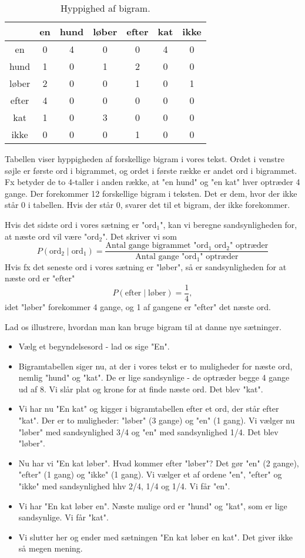 \documentclass{article}
\begin{document}
\begin{table}[h]
    \centering
    \begin{tabular}{c|cccccc}
         
         & en & hund & løber & efter &  kat & ikke\\
         \hline
        en & 0 & 4 & 0 & 0 & 4 & 0\\
        hund&1 & 0 & 1 & 2 & 0 & 0\\
         løber& 2 & 0 & 0 & 1 & 0 & 1 \\
      efter   & 4 & 0  & 0 & 0 & 0 & 0\\
      kat  & 1 & 0 & 3 & 0 & 0 & 0\\
       ikke  & 0 & 0 & 0 &1  & 0 & 0\\
    \end{tabular}
    \caption{Hyppighed af bigram.}
    \label{tab:my_label}
\end{table}

Tabellen viser hyppigheden af forskellige bigram i vores tekst.  Ordet i venstre søjle er første ord i bigrammet, og ordet i første række er andet ord i bigrammet. Fx betyder de to 4-taller i anden række, at "en hund" og "en kat" hver optræder 4 gange. Der forekommer 12 forskellige bigram i teksten. Det er dem, hvor der ikke står 0 i tabellen. Hvis der står 0, svarer det til et bigram, der ikke forekommer.

Hvis det sidste ord i vores sætning er "ord$_1$", kan vi beregne sandsynligheden for, at næste ord vil være "ord$_2$". Det skriver vi som
$$P(\text{ord}_2\mid \text{ord}_1) = \frac{\text{Antal gange bigrammet "ord$_1$ ord$_2$" optræder}}{\text{Antal gange "ord$_1$"  optræder}}$$
Hvis fx det seneste ord i vores sætning er "løber", så er sandsynligheden for at næste ord er "efter" 
$$P(\text{efter} \mid \text{løber})=\frac{1}{4},$$
idet "løber" forekommer 4 gange, og 1 af gangene er "efter" det næste ord.

Lad os illustrere, hvordan man kan bruge bigram til at danne nye sætninger.
\begin{itemize}
\item Vælg et begyndelsesord - lad os sige "En". 
\item Bigramtabellen siger nu, at der i vores tekst er to muligheder for næste ord, nemlig "hund" og "kat". De er lige sandsynlige - de optræder begge 4 gange ud af 8. Vi slår plat og krone for at finde næste ord. Det blev "kat".
\item Vi har nu "En kat" og kigger i bigramtabellen efter et ord, der står efter "kat". Der er to muligheder: "løber" (3 gange)  og "en" (1 gang). Vi vælger nu "løber" med sandsynlighed 3/4 og "en" med sandsynlighed 1/4. Det blev "løber".
\item Nu har vi "En kat løber". Hvad kommer efter "løber"? Det gør "en" (2 gange), "efter" (1 gang) og "ikke" (1 gang). Vi vælger et af ordene "en", "efter" og "ikke" med sandsynlighed hhv 2/4, 1/4 og 1/4. Vi får "en".
\item Vi har "En kat løber en". Næste mulige ord er "hund" og "kat", som er lige sandsynlige. Vi får "kat". 
\item Vi slutter her og ender med sætningen "En kat løber en kat". Det giver ikke så megen mening.
\end{itemize}
\end{document}
